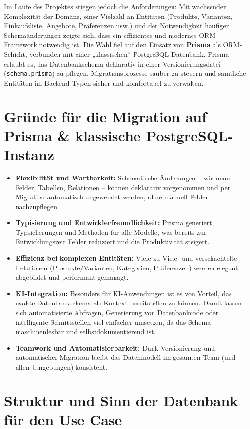 \documentclass[12pt, a4paper]{report} %
\begin{document}
Im Laufe des Projektes stiegen jedoch die Anforderungen: Mit wachsender Komplexität der Domäne, einer Vielzahl an Entitäten (Produkte, Varianten, Einkaufsliste, Angebote, Präferenzen usw.) und der Notwendigkeit häufiger Schemaänderungen zeigte sich, dass ein effizientes und modernes ORM-Framework notwendig ist. Die Wahl fiel auf den Einsatz von \textbf{Prisma} als ORM-Schicht, verbunden mit einer „klassischen“ PostgreSQL-Datenbank. Prisma erlaubt es, das Datenbankschema deklarativ in einer Versionierungsdatei (\texttt{schema.prisma}) zu pflegen, Migrationsprozesse sauber zu steuern und sämtliche Entitäten im Backend-Typen sicher und komfortabel zu verwalten.

\section{Gründe für die Migration auf Prisma \& klassische PostgreSQL-Instanz}

\begin{itemize}
    \item \textbf{Flexibilität und Wartbarkeit:} Schematische Änderungen – wie neue Felder, Tabellen, Relationen – können deklarativ vorgenommen und per Migration automatisch angewendet werden, ohne manuell Felder nachzupflegen.
    \item \textbf{Typisierung und Entwicklerfreundlichkeit:} Prisma generiert Typsicherungen und Methoden für alle Modelle, was bereits zur Entwicklungszeit Fehler reduziert und die Produktivität steigert.
    \item \textbf{Effizienz bei komplexen Entitäten:} Viele-zu-Viele- und verschachtelte Relationen (Produkte/Varianten, Kategorien, Präferenzen) werden elegant abgebildet und performant gemanagt.
    \item \textbf{KI-Integration:} Besonders für KI-Anwendungen ist es von Vorteil, das exakte Datenbankschema als Kontext bereitstellen zu können. Damit lassen sich automatisierte Abfragen, Generierung von Datenbankcode oder intelligente Schnittstellen viel einfacher umsetzen, da das Schema maschinenlesbar und selbstdokumentierend ist.
    \item \textbf{Teamwork und Automatisierbarkeit:} Dank Versionierung und automatischer Migration bleibt das Datenmodell im gesamten Team (und allen Umgebungen) konsistent.
\end{itemize}

\section{Struktur und Sinn der Datenbank für den Use Case}
\end{document}
